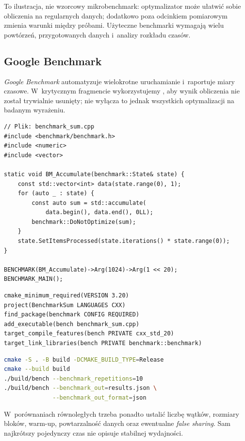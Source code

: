 To ilustracja, nie wzorcowy mikrobenchmark: optymalizator może
ułatwić sobie obliczenia na regularnych danych; dodatkowo
 poza odcinkiem pomiarowym zmienia warunki
między próbami. Użyteczne benchmarki wymagają wielu powtórzeń,
przygotowanych danych i~analizy rozkładu czasów.

\subsection{Google Benchmark}

\emph{Google Benchmark} automatyzuje wielokrotne uruchamianie i~raportuje
miary czasowe. W~krytycznym fragmencie wykorzystujemy
, aby wynik obliczenia nie został
trywialnie usunięty; nie wyłącza to jednak wszystkich optymalizacji
na badanym wyrażeniu.

\begin{lstlisting}[caption={Samodzielny benchmark sumowania wielu elementow.}]
// Plik: benchmark_sum.cpp
#include <benchmark/benchmark.h>
#include <numeric>
#include <vector>

static void BM_Accumulate(benchmark::State& state) {
    const std::vector<int> data(state.range(0), 1);
    for (auto _ : state) {
        const auto sum = std::accumulate(
            data.begin(), data.end(), 0LL);
        benchmark::DoNotOptimize(sum);
    }
    state.SetItemsProcessed(state.iterations() * state.range(0));
}

BENCHMARK(BM_Accumulate)->Arg(1024)->Arg(1 << 20);
BENCHMARK_MAIN();
\end{lstlisting}

\begin{lstlisting}[language={},caption={CMakeLists.txt dla przykładu Google Benchmark.}]
cmake_minimum_required(VERSION 3.20)
project(BenchmarkSum LANGUAGES CXX)
find_package(benchmark CONFIG REQUIRED)
add_executable(bench benchmark_sum.cpp)
target_compile_features(bench PRIVATE cxx_std_20)
target_link_libraries(bench PRIVATE benchmark::benchmark)
\end{lstlisting}

\begin{lstlisting}[language=bash,caption={Budowanie i powtarzanie pomiaru.}]
cmake -S . -B build -DCMAKE_BUILD_TYPE=Release
cmake --build build
./build/bench --benchmark_repetitions=10
./build/bench --benchmark_out=results.json \
              --benchmark_out_format=json
\end{lstlisting}

W~porównaniach równoległych trzeba ponadto ustalić liczbę wątków,
rozmiary bloków, warm-up, powtarzalność danych oraz ewentualne
\emph{false sharing}. Sam najkrótszy pojedynczy czas nie opisuje
stabilnej wydajności.

